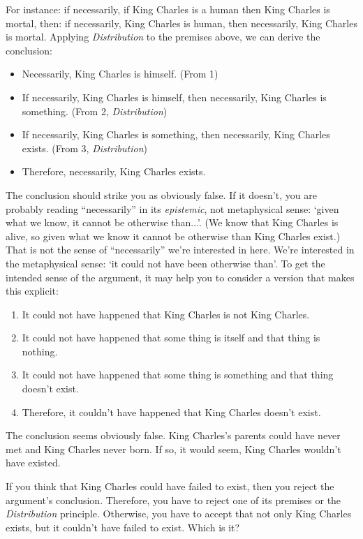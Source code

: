 \documentclass[../../../include/open-logic-chapter]{subfiles}
\begin{document}
For instance: if necessarily, if King Charles is a human then King
Charles is mortal, then: if necessarily, King Charles is human, then
necessarily, King Charles is mortal. Applying \emph{Distribution} to
the premises above, we can derive the conclusion:

\begin{itemize}
\item Necessarily, King Charles is himself. (From 1)
\item If necessarily, King Charles is himself, then necessarily, King
Charles is something. (From 2, \emph{Distribution})
\item If necessarily, King Charles is something, then necessarily,
King Charles exists. (From 3, \emph{Distribution})
\item Therefore, necessarily, King Charles exists.
\end{itemize}

The conclusion should strike you as obviously false. If it doesn't,
you are probably reading ``necessarily'' in its \emph{epistemic}, not
metaphysical sense: `given what we know, it cannot be otherwise
than...'. (We know that King Charles is alive, so given what we know
it cannot be otherwise than King Charles exist.) That is not the sense
of ``necessarily'' we're interested in here. We're interested in the
metaphysical sense: `it could not have been otherwise than'. To get
the intended sense of the argument, it may help you to consider a
version that makes this explicit:

\begin{enumerate}
\item It could not have happened that King Charles is not King Charles.
\item It could not have happened that some thing is itself and 
that thing is nothing.
\item It could not have happened that some thing is something and that
thing doesn't exist. 
\item Therefore, it couldn't have happened that King Charles doesn't
exist. 
\end{enumerate}

The conclusion seems obviously false. King Charles's parents could
have never met and King Charles never born. If so, it would seem, King
Charles wouldn't have existed. 

If you think that King Charles could have failed to exist, then you
reject the argument's conclusion. Therefore, you have to reject one of
its premises or the \emph{Distribution} principle. Otherwise, you have
to accept that not only King Charles exists, but it couldn't have
failed to exist. Which is it?
\end{document}
